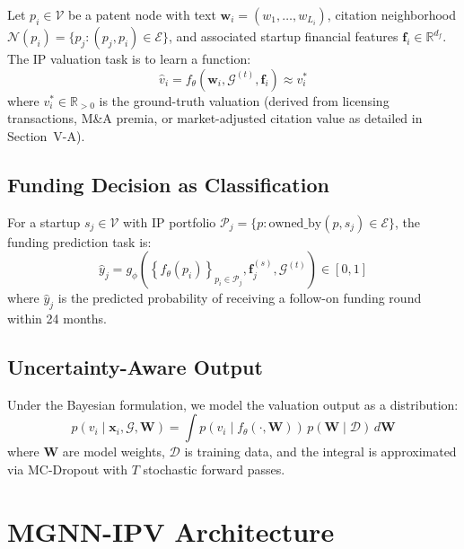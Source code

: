 \documentclass[journal]{IEEEtran}
\begin{document}
Let $p_i \in \mathcal{V}$ be a patent node with text $\mathbf{w}_i = (w_1, \ldots, w_{L_i})$, citation neighborhood $\mathcal{N}(p_i) = \{p_j : (p_j, p_i) \in \mathcal{E}\}$, and associated startup financial features $\mathbf{f}_i \in \mathbb{R}^{d_f}$. The IP valuation task is to learn a function:
\begin{equation}
    \hat{v}_i = f_\theta(\mathbf{w}_i, \mathcal{G}^{(t)}, \mathbf{f}_i) \approx v_i^*
    \label{eq:valuation_task}
\end{equation}
where $v_i^* \in \mathbb{R}_{>0}$ is the ground-truth valuation (derived from licensing transactions, M\&A premia, or market-adjusted citation value as detailed in Section~V-A).

\subsection{Funding Decision as Classification}

For a startup $s_j \in \mathcal{V}$ with IP portfolio $\mathcal{P}_j = \{p : \text{owned\_by}(p, s_j) \in \mathcal{E}\}$, the funding prediction task is:
\begin{equation}
    \hat{y}_j = g_\phi\!\left(\left\{f_\theta(p_i)\right\}_{p_i \in \mathcal{P}_j}, \mathbf{f}_j^{(s)}, \mathcal{G}^{(t)}\right) \in [0,1]
    \label{eq:funding_task}
\end{equation}
where $\hat{y}_j$ is the predicted probability of receiving a follow-on funding round within 24 months.

\subsection{Uncertainty-Aware Output}

Under the Bayesian formulation, we model the valuation output as a distribution:
\begin{equation}
    p(v_i \mid \mathbf{x}_i, \mathcal{G}, \mathbf{W}) = \int p(v_i \mid f_\theta(\cdot, \mathbf{W})) \, p(\mathbf{W} \mid \mathcal{D}) \, d\mathbf{W}
    \label{eq:bayesian}
\end{equation}
where $\mathbf{W}$ are model weights, $\mathcal{D}$ is training data, and the integral is approximated via MC-Dropout with $T$ stochastic forward passes.

\section{MGNN-IPV Architecture}
\end{document}
